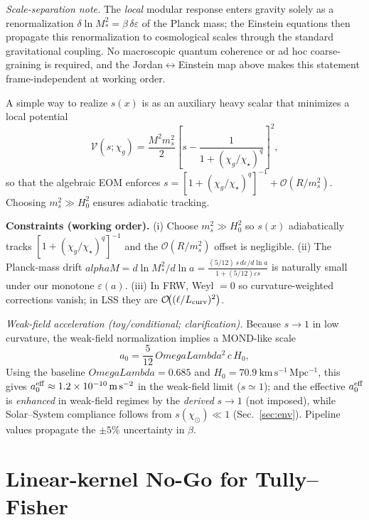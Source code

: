 \documentclass[aps,prd,onecolumn,superscriptaddress,nofootinbib]{revtex4-2}
\def\OmL{OmegaLambda}%
\def\alpha{alpha}%
\def\alpha_M{alphaM}%
\def\Omega_\Lambda{OmegaLambda}%
\providecommand{\OmL}{\Omega_\Lambda}
\providecommand{\be}{\begin{equation}}
\providecommand{\ee}{\end{equation}}
\begin{document}
\noindent\emph{Scale-separation note.} The \emph{local} modular response enters gravity solely as a renormalization \(\delta\!\ln M_*^2=\beta\,\delta\varepsilon\) of the Planck mass; the Einstein equations then propagate this renormalization to cosmological scales through the standard gravitational coupling. No macroscopic quantum coherence or ad hoc coarse-graining is required, and the Jordan\(\leftrightarrow\)Einstein map above makes this statement frame-independent at working order.

A simple way to realize \(s(x)\) is as an auxiliary heavy scalar that minimizes a local potential
\[
\mathcal V(s;\chi_g)=\frac{M^2 m_s^2}{2}\left[s-\frac{1}{1+(\chi_g/\chi_\star)^q}\right]^2,
\]
so that the algebraic EOM enforces \(s=[1+(\chi_g/\chi_\star)^q]^{-1}+\mathcal O(R/m_s^2)\). Choosing \(m_s^2\!\gg\!H_0^2\) ensures adiabatic tracking.

\noindent\textbf{Constraints (working order).}
(i) Choose \(m_s^2\gg H_0^2\) so \(s(x)\) adiabatically tracks \([1+(\chi_g/\chi_\star)^q]^{-1}\) and the \(\mathcal O(R/m_s^2)\) offset is negligible.
(ii) The Planck-mass drift \(\alpha_M=d\ln M_*^2/d\ln a=\frac{(5/12)\,s\,d\varepsilon/d\ln a}{1+(5/12)\varepsilon s}\) is naturally small under our monotone \(\varepsilon(a)\).
(iii) In FRW, Weyl \(=0\) so curvature-weighted corrections vanish; in LSS they are \(\mathcal O\!\big((\ell/L_{\rm curv})^2\big)\).

\noindent \emph{Weak-field acceleration (toy/conditional; clarification).} Because \(s\!\to\!1\) in low curvature, the weak-field normalization implies a MOND-like scale
\be
a_0=\frac{5}{12}\,\OmL^2\,c\,H_0,
\ee
Using the baseline \(\OmL=0.685\) and \(H_0=70.9~\mathrm{km\,s^{-1}\,Mpc^{-1}}\), this gives \(a_0^{\rm eff}\approx 1.2\times 10^{-10}\,\mathrm{m\,s^{-2}}\) in the weak-field limit (\(s\simeq 1\));
and the effective \(a_0^{\rm eff}\) is \emph{enhanced} in weak-field regimes by the \emph{derived} \(s\!\to\!1\) (not imposed), while Solar–System compliance follows from \(s(\chi_\odot)\ll 1\) (Sec.~\ref{sec:env}). Pipeline values propagate the \(\pm 5\%\) uncertainty in \(\beta\).

\section{Linear-kernel No-Go for Tully–Fisher}
\label{sec:no-go}
\end{document}

